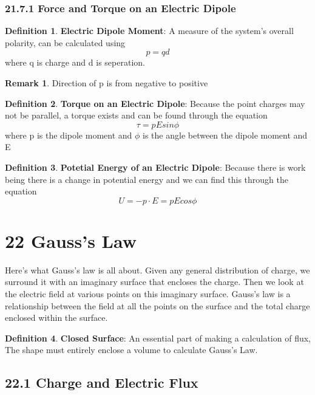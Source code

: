 \documentclass[12pt]{amsart}
\theoremstyle{definition}
\newtheorem{definition}{Definition} %
\newtheorem*{remark}{Remark}        %
\numberwithin{equation}{theorem}    %
\begin{document}
\subsubsection*{21.7.1 Force and Torque on an Electric Dipole}

\begin{definition}
    \textbf{Electric Dipole Moment}:
    A measure of the system's overall polarity,
    can be calculated using $$p = qd$$ where q is charge and d is seperation.
    
    \begin{remark}
        Direction of p is from negative to positive
    \end{remark}
\end{definition}

\begin{definition}
    \textbf{Torque on an Electric Dipole}:
    Because the point charges may not be
    parallel, a torque exists and can be found through the equation $$\tau = pEsin\phi$$
    where p is the dipole moment and $\phi$ is the angle between the dipole moment and E
\end{definition}

\begin{definition}
    \textbf{Potetial Energy of an Electric Dipole}:
    Because there is work being
    there is a change in potential energy and we can find this through the equation
    $$U =-p\cdot E = pEcos\phi$$ 
\end{definition}

\section*{22 Gauss's Law}
 Here’s what Gauss’s law is all about. Given any general distribution of charge,
 we surround it with an imaginary surface that encloses the charge. Then we 
 look at the electric field at various points on this imaginary surface. 
 Gauss’s law is a relationship between the field at all the points on the 
 surface and the total charge enclosed within the surface.

 \begin{definition}
    \textbf{Closed Surface}:
    An essential part of making a calculation of flux,
    The shape must entirely enclose a volume to calculate Gauss's Law.
\end{definition}


 \subsection*{22.1 Charge and Electric Flux}
\end{document}
